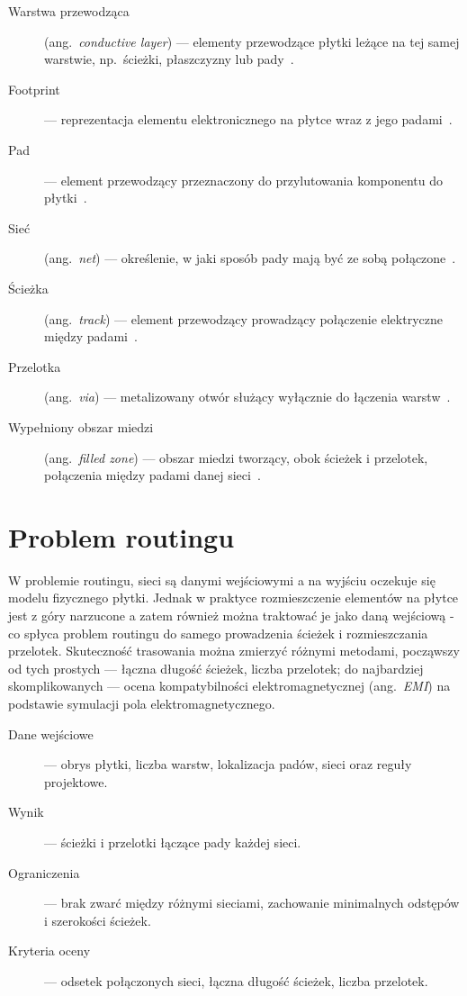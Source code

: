\begin{description}
  \item[Warstwa przewodząca] (ang.~\emph{conductive layer}) --- elementy
    przewodzące płytki leżące na tej samej warstwie, np.~ścieżki, płaszczyzny
    lub pady~\cite{ECSS_Q_ST_70_12C_Rev1}.
  \item[Footprint] --- reprezentacja elementu elektronicznego na płytce wraz
    z jego padami~\cite{KiCad_PCBEditor_BasicConcepts}.
  \item[Pad] --- element
    przewodzący przeznaczony do przylutowania komponentu do
    płytki~\cite{ECSS_Q_ST_70_12C_Rev1}.
  \item[Sieć] (ang.~\emph{net}) --- określenie, w jaki sposób pady mają być ze
    sobą połączone~\cite{KiCad_PCBEditor_BasicConcepts}.
  \item[Ścieżka] (ang.~\emph{track}) --- element przewodzący prowadzący
    połączenie elektryczne między padami~\cite{ECSS_Q_ST_70_12C_Rev1}.
  \item[Przelotka] (ang.~\emph{via}) --- metalizowany otwór służący wyłącznie
    do łączenia warstw~\cite{ECSS_Q_ST_70_12C_Rev1}.
  \item[Wypełniony obszar miedzi] (ang.~\emph{filled zone}) --- obszar miedzi
    tworzący, obok ścieżek i przelotek, połączenia między padami danej
    sieci~\cite{KiCad_PCBEditor_BasicConcepts}.
\end{description}

\section{Problem routingu}

W problemie routingu, sieci są danymi wejściowymi a na wyjściu oczekuje się modelu fizycznego płytki. Jednak w praktyce
rozmieszczenie elementów na płytce jest z góry narzucone a zatem również można traktować je jako daną wejściową - co spłyca
problem routingu do samego prowadzenia ścieżek i rozmieszczania przelotek. Skuteczność trasowania można 
zmierzyć różnymi metodami, począwszy od tych prostych --- łączna długość ścieżek, liczba przelotek;
do najbardziej skomplikowanych --- ocena kompatybilności elektromagnetycznej (ang.~\emph{EMI})
na podstawie symulacji pola elektromagnetycznego.

\begin{description}
  \item[Dane wejściowe] --- obrys płytki, liczba warstw, lokalizacja padów,
    sieci oraz reguły projektowe.
  \item[Wynik] --- ścieżki i przelotki łączące pady każdej sieci.
  \item[Ograniczenia] --- brak zwarć między różnymi sieciami, zachowanie
    minimalnych odstępów i szerokości ścieżek.
  \item[Kryteria oceny] --- odsetek połączonych sieci, łączna długość ścieżek,
    liczba przelotek.
\end{description}


